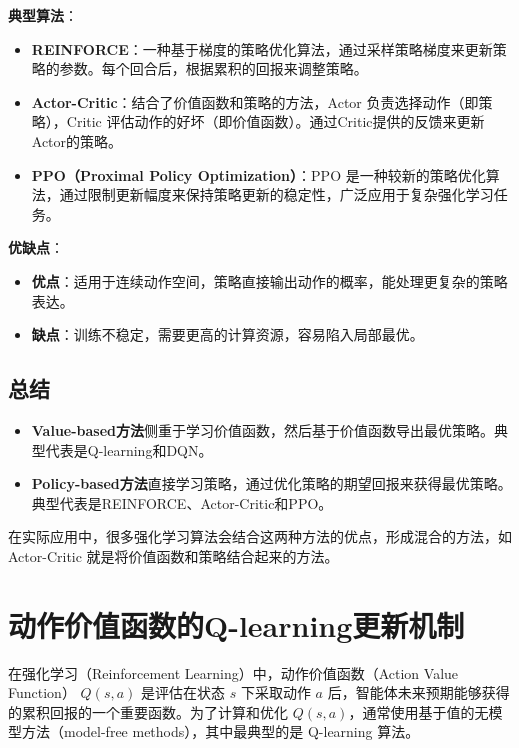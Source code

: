 \documentclass[twocolumn, 10pt]{article} %
\theoremstyle{remark}
\begin{document}
\textbf{典型算法}：

\begin{itemize}
    \item \textbf{REINFORCE}：一种基于梯度的策略优化算法，通过采样策略梯度来更新策略的参数。每个回合后，根据累积的回报来调整策略。

    \item \textbf{Actor-Critic}：结合了价值函数和策略的方法，Actor 负责选择动作（即策略），Critic 评估动作的好坏（即价值函数）。通过Critic提供的反馈来更新Actor的策略。

    \item \textbf{PPO（Proximal Policy Optimization）}：PPO 是一种较新的策略优化算法，通过限制更新幅度来保持策略更新的稳定性，广泛应用于复杂强化学习任务。
\end{itemize}

\textbf{优缺点}：
\begin{itemize}
    \item \textbf{优点}：适用于连续动作空间，策略直接输出动作的概率，能处理更复杂的策略表达。
    \item \textbf{缺点}：训练不稳定，需要更高的计算资源，容易陷入局部最优。
\end{itemize}

\subsection{总结}

\begin{itemize}
    \item \textbf{Value-based方法}侧重于学习价值函数，然后基于价值函数导出最优策略。典型代表是Q-learning和DQN。
    \item \textbf{Policy-based方法}直接学习策略，通过优化策略的期望回报来获得最优策略。典型代表是REINFORCE、Actor-Critic和PPO。
\end{itemize}

在实际应用中，很多强化学习算法会结合这两种方法的优点，形成混合的方法，如Actor-Critic 就是将价值函数和策略结合起来的方法。

\section{动作价值函数的Q-learning更新机制}

在强化学习（Reinforcement Learning）中，动作价值函数（Action Value Function） \( Q(s, a) \) 是评估在状态 \( s \) 下采取动作 \( a \) 后，智能体未来预期能够获得的累积回报的一个重要函数。为了计算和优化 \( Q(s, a) \)，通常使用基于值的无模型方法（model-free methods），其中最典型的是 Q-learning 算法。
\end{document}
